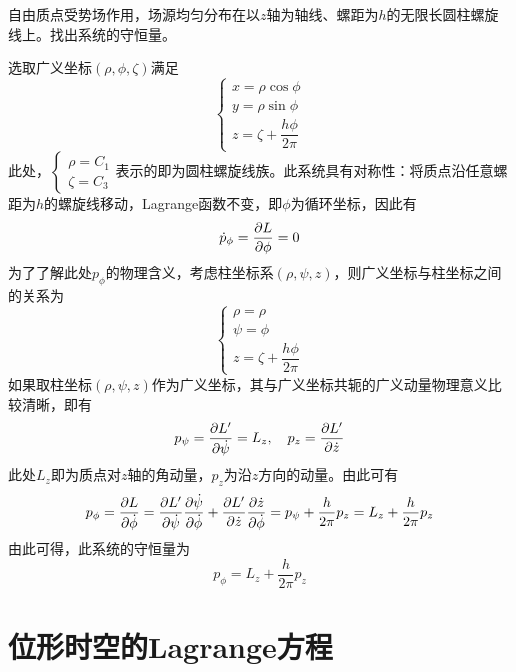 \begin{example}
自由质点受势场作用，场源均匀分布在以$z$轴为轴线、螺距为$h$的无限长圆柱螺旋线上。找出系统的守恒量。
\end{example}
\begin{solution}
选取广义坐标$(\rho,\phi,\zeta)$满足
\begin{equation*}
\begin{cases}
	x = \rho \cos \phi \\
	y = \rho \sin \phi \\
	z = \zeta + \dfrac{h\phi}{2\pi}
\end{cases}
\end{equation*}
此处，$\begin{cases} \rho = C_1 \\ \zeta = C_3 \end{cases}$表示的即为圆柱螺旋线族。此系统具有对称性：将质点沿任意螺距为$h$的螺旋线移动，Lagrange函数不变，即$\phi$为循环坐标，因此有
\begin{equation*}
	\dot{p}_\phi = \frac{\partial L}{\partial \phi} = 0
\end{equation*}
为了了解此处$p_\phi$的物理含义，考虑柱坐标系$(\rho,\psi,z)$，则广义坐标与柱坐标之间的关系为
\begin{equation*}
\begin{cases}
	\rho = \rho \\
	\psi = \phi \\
	z = \zeta + \dfrac{h\phi}{2\pi}
\end{cases}
\end{equation*}
如果取柱坐标$(\rho,\psi,z)$作为广义坐标，其与广义坐标共轭的广义动量物理意义比较清晰，即有
\begin{equation*}
	p_\psi = \frac{\partial L'}{\partial \dot{\psi}} = L_z,\quad p_z = \frac{\partial L'}{\partial \dot{z}}
\end{equation*}
此处$L_z$即为质点对$z$轴的角动量，$p_z$为沿$z$方向的动量。由此可有
\begin{equation*}
	p_\phi = \frac{\partial L}{\partial \dot{\phi}} = \frac{\partial L'}{\partial \dot{\psi}} \frac{\partial \dot{\psi}}{\partial \dot{\phi}} + \frac{\partial L'}{\partial \dot{z}} \frac{\partial \dot{z}}{\partial \dot{\phi}} = p_\psi + \frac{h}{2\pi} p_z = L_z + \frac{h}{2\pi} p_z
\end{equation*}
由此可得，此系统的守恒量为
\begin{equation*}
	p_\phi = L_z + \frac{h}{2\pi} p_z
\end{equation*}
\end{solution}

\section{位形时空的Lagrange方程}


